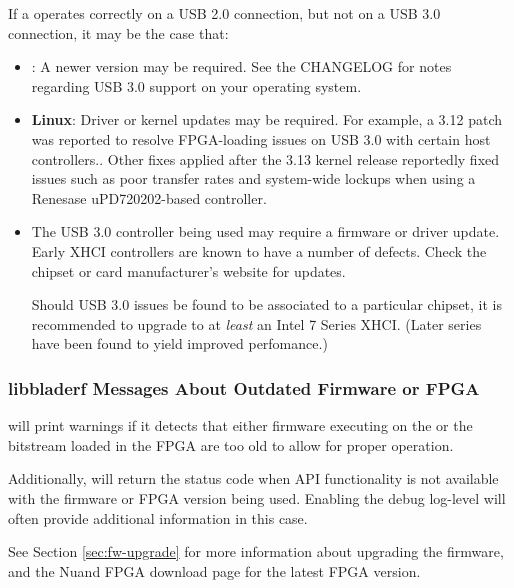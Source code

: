 If a \bladerf operates correctly on a USB 2.0 connection, but not on a USB 3.0
connection, it may be the case that: \begin{itemize}
    \item \textbf{\libusb}: A newer \libusb version may be required. See the
        \libusb CHANGELOG \cite{LIBUSB_CHANGELOG} for notes regarding USB 3.0
        support on your operating system.

    \item \textbf{Linux}: Driver or kernel updates may be required. For example,
        a 3.12 patch \cite{LINUX_SGLIMIT_PATCH} was reported to resolve
        FPGA-loading issues on USB 3.0 with certain host controllers.. Other
        fixes applied after the 3.13 kernel release reportedly fixed issues
        such as poor transfer rates and system-wide lockups when using a
        Renesase uPD720202-based
        controller.

    \item The USB 3.0 controller being used may require a firmware or driver
        update.  Early XHCI controllers are known to have a number of defects.
        Check the chipset or card manufacturer's website for updates.

        Should USB 3.0 issues be found to be associated to a particular chipset, it is
        recommended to upgrade to at \textit{least} an Intel 7 Series XHCI. (Later
        series have been found to yield improved perfomance.)

\end{itemize}

\subsubsection{libbladerf Messages About Outdated Firmware or FPGA}

\libbladerf will print warnings if it detects that either firmware executing on the 
or the bitstream loaded in the FPGA are too old to allow for proper operation.

Additionally, \libbladerf will return the  status
code when API functionality is not available with the firmware or FPGA version being
used. Enabling the debug log-level will often provide additional information in
this case.

See Section \ref{sec:fw-upgrade} for more information about upgrading the  firmware,
and the Nuand FPGA download page \cite{BLADERF_FPGA} for the latest FPGA version.

